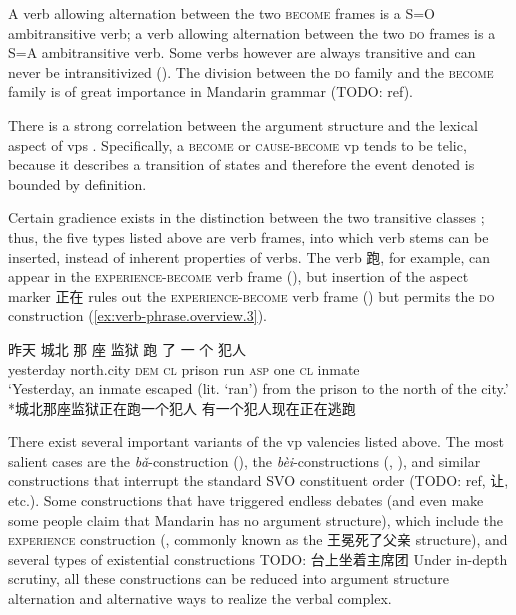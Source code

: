 \documentclass[UTF8, a4paper, oneside, scheme=plain, 12pt]{ctexrep}
\newcommand{\form}[1]{\emph{#1}}
\newcommand{\translate}[1]{`#1'}
\newcommand*{\category}[1]{\textsc{#1}}
\begin{document}
A verb allowing alternation between the two \category{become} frames 
is a S=O ambitransitive verb;
a verb allowing alternation between the two \category{do} frames 
is a S=A ambitransitive verb. 
Some verbs however are always transitive 
and can never be intransitivized
(). 
The division between the \category{do} family and the \category{become} family 
is of great importance in Mandarin grammar (TODO: ref). 

There is a strong correlation between the argument structure 
and the lexical aspect of \acs{vp}s
\citep{laws2010core,toratani1997typology,aljovic2000unaccusativity}.
Specifically, a \category{become} or \category{cause}-\category{become} \acs{vp}
tends to be telic, 
because it describes a transition of states 
and therefore the event denoted is bounded by definition.

Certain gradience exists in the distinction between the two transitive classes
\citep{lin2021unaccusativity,huang2007}; 
thus, the five types listed above are verb frames, 
into which verb stems can be inserted, 
instead of inherent properties of verbs. 
The verb 跑, for example, 
can appear in the \category{experience}-\category{become} verb frame  
(), 
but insertion of the aspect marker 正在 
rules out the \category{experience}-\category{become} verb frame 
()
but permits the \category{do} construction 
(\ref{ex:verb-phrase.overview.3}).

\begin{exe}
    \ex\label{ex:verb-phrase.overview.1} \gll 昨天 城北 那 座 监狱 跑 了 一 个 犯人 \\
    yesterday north.city \category{dem} \category{cl} prison run \category{asp} one \category{cl} inmate \\
    \glt \translate{Yesterday, an inmate escaped (lit. `ran') from the prison to the north of the city.} 
    \ex\label{ex:verb-phrase.overview.2} *城北那座监狱正在跑一个犯人
    \ex\label{ex:verb-phrase.overview.3} 有一个犯人现在正在逃跑
\end{exe}

There exist several important variants of the \acs{vp} valencies listed above.
The most salient cases are the \form{bǎ}-construction (),
the \form{bèi}-constructions 
(, 
),
and similar constructions that interrupt the standard SVO constituent order (TODO: ref, 让, etc.).
Some constructions that have triggered endless debates 
(and even make some people claim that Mandarin has no argument structure),
which include the \category{experience} construction 
(, commonly known as the 王冕死了父亲 structure),
and several types of existential constructions TODO: 台上坐着主席团
Under in-depth scrutiny, 
all these constructions can be reduced into argument structure alternation 
and alternative ways to realize the verbal complex.
\end{document}
